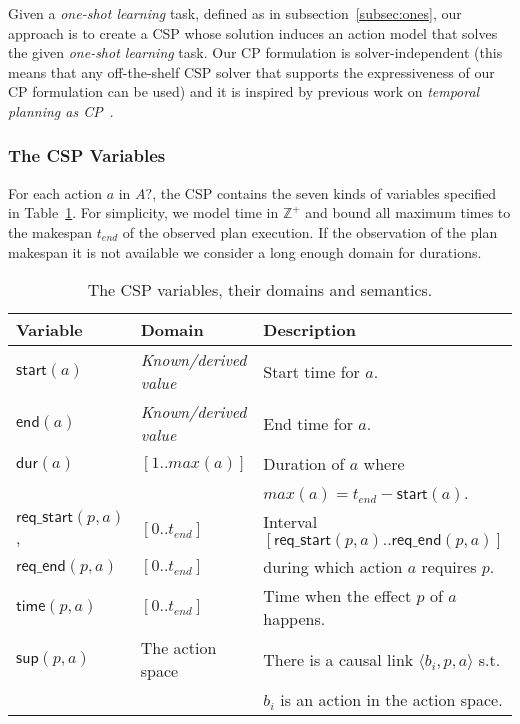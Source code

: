 \documentclass{ecai}
\newcommand{\tup}[1]{{\langle #1 \rangle}}
\newcommand{\dur}{\mathsf{dur}}    %
\newcommand{\start}{\mathsf{start}}%
\newcommand{\en}{\mathsf{end}}     %
\newcommand{\supp}{\mathsf{sup}}   %
\newcommand{\tim}{\mathsf{time}}   %
\newcommand{\reqs}{\mathsf{req\_{start}}} %
\newcommand{\reqe}{\mathsf{req\_{end}}}   %
\begin{document}
Given a {\em one-shot learning} task, defined as in subsection~\ref{subsec:ones}, our approach is to create a CSP whose solution induces an action model that solves the given {\em one-shot learning} task. Our CP formulation is solver-independent (this means that any off-the-shelf CSP solver that supports the expressiveness of our CP formulation can be used) and it is inspired by previous work on {\em temporal planning as CP}~\cite{vidal2006branching,garrido2009constraint}. 

\subsubsection{The CSP Variables}
For each action $a$ in $A?$, the CSP contains the seven kinds of variables specified in Table~\ref{table:variables}. For simplicity, we model time in $\mathbb{Z}^+$ and bound all maximum times to the makespan $t_{end}$ of the observed plan execution. If the observation of the plan makespan it is not available we consider a long enough domain for durations.

\begin{table}
\setlength\extrarowheight{2pt}  
\begin{scriptsize}
\begin{tabular}{lll}
{\bf Variable} & {\bf Domain} & {\bf Description} \\\hline
$\start(a)$ & \emph{Known/derived value} & Start time for $a$.\\
$\en(a)$ & \emph{Known/derived value} & End time for $a$.\\
$\dur(a)$ & $[1..max(a)]$ & Duration of $a$ where \\
&&$max(a)=t_{end}-\start(a)$.\\

$\reqs(p,a)$, & $[0..t_{end}]$ & Interval $[\reqs(p,a)..\reqe(p,a)]$ \\ 
$\reqe(p,a)$  & $[0..t_{end}]$ & during which action $a$ requires $p$.\\

$\tim(p,a)$ & $[0..t_{end}]$ & Time when the effect $p$ of $a$ happens.\\

$\supp(p,a)$ & The action space & There is a causal link $\tup{b_i,p,a}$ s.t.\\
&& $b_i$ is an action in the action space. 
\end{tabular}
\end{scriptsize}
\caption{\small The CSP variables, their domains and semantics.}
\label{table:variables}
\end{table}
\end{document}
